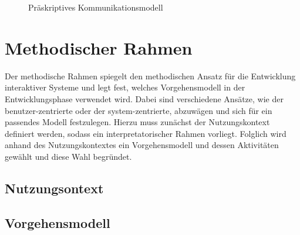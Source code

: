 \documentclass[a4paper,11pt]{article}%
\renewcommand{\\}{\vspace*{0.5\baselineskip} \newline}
\begin{document}
\begin{figure}[H]
	\centering
	\setlength{\fboxsep}{1pt}
	\setlength{\fboxrule}{1pt}
	\captionsetup{justification=centering}
	\caption{Präskriptives Kommunikationsmodell}
	\label{img:präskriptiv}
\end{figure}


\newpage

\section{Methodischer Rahmen}
Der methodische Rahmen spiegelt den methodischen Ansatz für die Entwicklung interaktiver Systeme und legt fest, welches Vorgehensmodell in der Entwicklungsphase verwendet wird. Dabei sind verschiedene Ansätze, wie der benutzer-zentrierte oder der system-zentrierte, abzuwägen und sich für ein passendes Modell festzulegen. Hierzu muss zunächst der Nutzungskontext definiert werden, sodass ein interpretatorischer Rahmen vorliegt. Folglich wird anhand des Nutzungskontextes ein Vorgehensmodell und dessen Aktivitäten gewählt und diese Wahl begründet.
\subsection{Nutzungsontext}

\subsection{Vorgehensmodell}
\end{document}
